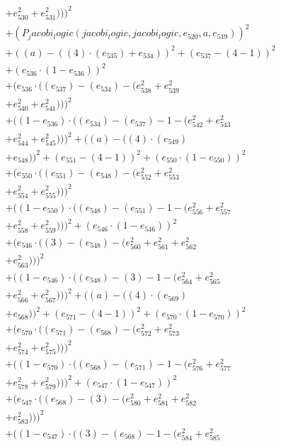 \documentclass[10pt, a4paper]{article}
\begin{document}
\begin{align*}
& + e_{530}^{2} + e_{531}^{2})))^{2} \\
& + (P_jacobi_logic(jacobi_logic, jacobi_logic, e_{520}, a, e_{519}))^{2} \\
& + ((a) - ((4)  \cdot  (e_{535}) + e_{534}))^{2} + (e_{537} - (4 - 1))^{2} \\
& + (e_{536}  \cdot  (1 - e_{536}))^{2} \\
& + (e_{536}  \cdot  ((e_{537}) - (e_{534}) - (e_{538}^{2} + e_{539}^{2} \\
& + e_{540}^{2} + e_{541}^{2})))^{2} \\
& + ((1 - e_{536})  \cdot  ((e_{534}) - (e_{537}) - 1 - (e_{542}^{2} + e_{543}^{2} \\
& + e_{544}^{2} + e_{545}^{2})))^{2} + ((a) - ((4)  \cdot  (e_{549}) \\
& + e_{548}))^{2} + (e_{551} - (4 - 1))^{2} + (e_{550}  \cdot  (1 - e_{550}))^{2} \\
& + (e_{550}  \cdot  ((e_{551}) - (e_{548}) - (e_{552}^{2} + e_{553}^{2} \\
& + e_{554}^{2} + e_{555}^{2})))^{2} \\
& + ((1 - e_{550})  \cdot  ((e_{548}) - (e_{551}) - 1 - (e_{556}^{2} + e_{557}^{2} \\
& + e_{558}^{2} + e_{559}^{2})))^{2} + (e_{546}  \cdot  (1 - e_{546}))^{2} \\
& + (e_{546}  \cdot  ((3) - (e_{548}) - (e_{560}^{2} + e_{561}^{2} + e_{562}^{2} \\
& + e_{563}^{2})))^{2} \\
& + ((1 - e_{546})  \cdot  ((e_{548}) - (3) - 1 - (e_{564}^{2} + e_{565}^{2} \\
& + e_{566}^{2} + e_{567}^{2})))^{2} + ((a) - ((4)  \cdot  (e_{569}) \\
& + e_{568}))^{2} + (e_{571} - (4 - 1))^{2} + (e_{570}  \cdot  (1 - e_{570}))^{2} \\
& + (e_{570}  \cdot  ((e_{571}) - (e_{568}) - (e_{572}^{2} + e_{573}^{2} \\
& + e_{574}^{2} + e_{575}^{2})))^{2} \\
& + ((1 - e_{570})  \cdot  ((e_{568}) - (e_{571}) - 1 - (e_{576}^{2} + e_{577}^{2} \\
& + e_{578}^{2} + e_{579}^{2})))^{2} + (e_{547}  \cdot  (1 - e_{547}))^{2} \\
& + (e_{547}  \cdot  ((e_{568}) - (3) - (e_{580}^{2} + e_{581}^{2} + e_{582}^{2} \\
& + e_{583}^{2})))^{2} \\
& + ((1 - e_{547})  \cdot  ((3) - (e_{568}) - 1 - (e_{584}^{2} + e_{585}^{2} \\

\end{align*}
\end{document}
